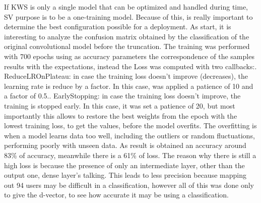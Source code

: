 If KWS is only a single model that can be optimized and handled during time, SV purpose is to be a one-training model. Because of this, is really important to determine the best configuration possible for a deployment. As start, it is interesting to analyze the confusion matrix obtained by the classification of the original convolutional model before the truncation. 
The training was performed with 700 epochs using as accuracy parameters the correspondence of the samples results with the expectations, instead the Loss was computed with two callbacks:. ReduceLROnPlateau: in case the training loss doesn't improve (decreases), the learning rate is reduce by a factor. In this case, was applied a patience of 10 and a factor of 0.5.. EarlyStopping: in case the training loss doesn't improve, the training is stopped early. In this case, it was set a patience of 20, but most importantly this allows to restore the best weights from the epoch with the lowest training loss, to get the values, before the model overfits. The overfitting is when a model learns data too well, including the outliers or random fluctuations, performing poorly with unseen data.
As result is obtained an accuracy around 83\% of accuracy, meanwhile there is a 61\% of loss. The reason why there is still a high loss is because the presence of only an intermediate layer, other than the output one, dense layer's talking. This leads to less precision because mapping out 94 users may be difficult in a classification, however all of this was done only to give the d-vector, to see how accurate it may be using a classification.
